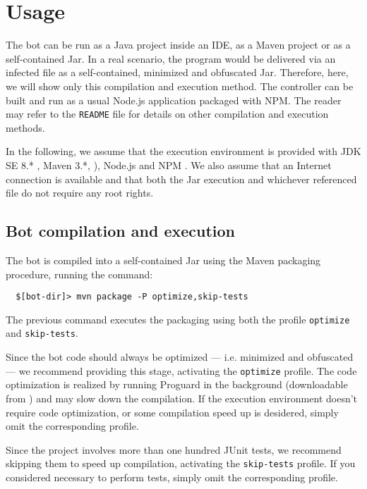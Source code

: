 \section{Usage}
\label{sec:usage}

The bot can be run as a Java project inside an IDE, as a Maven project or as a self-contained Jar.
In a real scenario, the program would be delivered via an infected file as a self-contained, minimized and obfuscated Jar. Therefore, here, we will show only this compilation and execution method.
The controller can be built and run as a usual Node.js application packaged with NPM.
The reader may refer to the \texttt{README} file for details on other compilation and execution methods.

In the following, we assume that the execution environment is provided with JDK SE 8.* \cite{jdk}, Maven 3.*, \cite{maven}), Node.js \cite{nodejs} and NPM \cite{npm}. We also assume that an Internet connection is available and that both the Jar execution and whichever referenced file do not require any root rights.

\subsection{Bot compilation and execution}
\label{sec:bot-compilation-execution}

The bot is compiled into a self-contained Jar using the Maven packaging procedure, running the command:

\begin{verbatim}
  $[bot-dir]> mvn package -P optimize,skip-tests
\end{verbatim}

The previous command executes the packaging using both the profile \texttt{optimize} and \texttt{skip-tests}.

Since the bot code should always be optimized — i.e. minimized and obfuscated — we recommend providing this stage, activating the \texttt{optimize} profile. The code optimization is realized by running Proguard in the background (downloadable from \cite{proguard}) and may slow down the compilation. If the execution environment doesn't require code optimization, or some compilation speed up is desidered, simply omit the corresponding profile.

Since the project involves more than one hundred JUnit tests, we recommend skipping them to speed up compilation, activating the \texttt{skip-tests} profile. If you considered necessary to perform tests, simply omit the corresponding profile.

